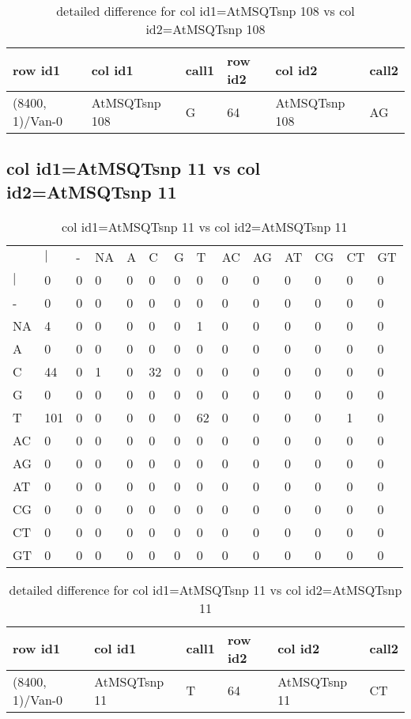 \begin{center}
\begin{longtable}{|l|l|l|l|l|l|}
\caption{detailed difference for col id1=AtMSQTsnp 108 vs col id2=AtMSQTsnp 108} \label{table_dm503}\\
\hline
row id1&col id1&call1&row id2&col id2&call2\\
\hline
(8400, 1)/Van-0&AtMSQTsnp 108&G&64&AtMSQTsnp 108&AG\\
\hline
\end{longtable}
\end{center}

\subsection{col id1=AtMSQTsnp 11 vs col id2=AtMSQTsnp 11}
\begin{center}
\begin{longtable}{|l|l|l|l|l|l|l|l|l|l|l|l|l|l|}
\caption{col id1=AtMSQTsnp 11 vs col id2=AtMSQTsnp 11} \label{table_dm504}\\
\hline
\\
\hline
&$|$&-&NA&A&C&G&T&AC&AG&AT&CG&CT&GT\\
$|$&0&0&0&0&0&0&0&0&0&0&0&0&0\\
-&0&0&0&0&0&0&0&0&0&0&0&0&0\\
NA&4&0&0&0&0&0&1&0&0&0&0&0&0\\
A&0&0&0&0&0&0&0&0&0&0&0&0&0\\
C&44&0&1&0&32&0&0&0&0&0&0&0&0\\
G&0&0&0&0&0&0&0&0&0&0&0&0&0\\
T&101&0&0&0&0&0&62&0&0&0&0&1&0\\
AC&0&0&0&0&0&0&0&0&0&0&0&0&0\\
AG&0&0&0&0&0&0&0&0&0&0&0&0&0\\
AT&0&0&0&0&0&0&0&0&0&0&0&0&0\\
CG&0&0&0&0&0&0&0&0&0&0&0&0&0\\
CT&0&0&0&0&0&0&0&0&0&0&0&0&0\\
GT&0&0&0&0&0&0&0&0&0&0&0&0&0\\
\hline
\end{longtable}
\end{center}

\begin{center}
\begin{longtable}{|l|l|l|l|l|l|}
\caption{detailed difference for col id1=AtMSQTsnp 11 vs col id2=AtMSQTsnp 11} \label{table_dm505}\\
\hline
row id1&col id1&call1&row id2&col id2&call2\\
\hline
(8400, 1)/Van-0&AtMSQTsnp 11&T&64&AtMSQTsnp 11&CT\\
\hline
\end{longtable}
\end{center}

